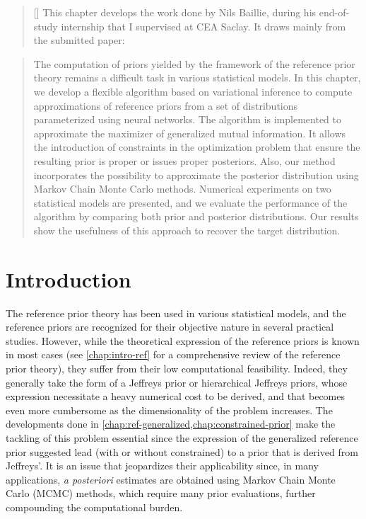 

\begin{abstract}[\hspace*{-10pt}]
    This chapter develops the work
    done by Nils Baillie, during his end-of-study internship that I supervised at CEA Saclay.
    It draws mainly from the submitted paper: 
\end{abstract}

\begin{abstract}
    The computation of priors yielded by the framework of the reference prior theory remains a difficult task in various statistical models. 
    In this chapter, we develop a flexible algorithm based on variational inference to compute approximations of reference priors from a set of distributions parameterized using neural networks. The algorithm is implemented to approximate the maximizer of generalized mutual information. It allows the introduction of constraints in the optimization problem that ensure the resulting prior is proper or issues proper posteriors. Also, our method incorporates the possibility to approximate the posterior distribution using Markov Chain Monte Carlo methods. Numerical experiments on two statistical models are presented, 
    and we evaluate the performance of the algorithm by comparing both prior and posterior distributions.
    Our results show the usefulness of this approach to recover the target distribution.
\end{abstract}

\minitoc


\section{Introduction}\label{sec:VARP:intro}


The reference prior theory %
has been used in various statistical models, and the reference priors are recognized for their objective nature in several practical studies.
However,
while the theoretical expression of the reference priors is known in most cases (see \cref{chap:intro-ref} for a comprehensive review of the reference prior theory), they suffer from their low computational feasibility.
Indeed, they generally take the form of a Jeffreys prior or hierarchical Jeffreys priors, whose expression necessitate a heavy numerical cost to be derived, and that becomes even more cumbersome as the dimensionality of the problem increases.
The developments done in \cref{chap:ref-generalized,chap:constrained-prior} make the tackling of this problem essential since the expression of the generalized reference prior suggested lead (with or without constrained) to a prior that is derived from Jeffreys'.
It is an issue that jeopardizes %
their applicability since, in many applications, \emph{a posteriori} estimates are obtained using Markov Chain Monte Carlo (MCMC) methods, which require many prior evaluations, further compounding the computational burden.

